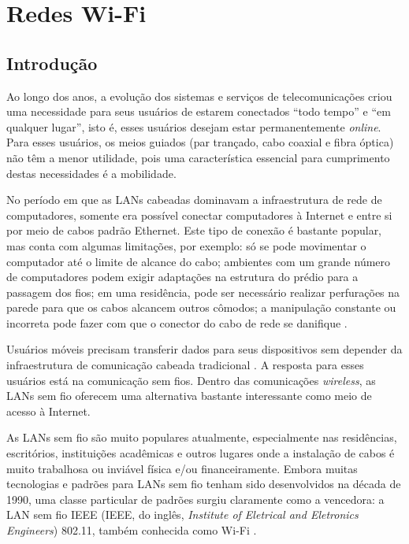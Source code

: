 \chapter{Redes Wi-Fi}
\label{cap:redes-wifi}

\section{Introdução}
\label{sec:introducao}

Ao longo dos anos, a evolução  dos sistemas e serviços de telecomunicações criou uma necessidade para seus usuários de estarem conectados ``todo tempo'' e ``em qualquer lugar'', isto é, esses usuários desejam estar permanentemente \textit{online}. Para esses usuários, os meios guiados (par trançado, cabo coaxial e fibra óptica) não têm a menor utilidade, pois uma característica essencial para cumprimento destas necessidades é a mobilidade.

No período em que as LANs cabeadas dominavam a infraestrutura de rede de computadores, somente era possível conectar computadores à Internet e entre si por meio de cabos padrão Ethernet. Este tipo de conexão é bastante popular, mas conta com algumas limitações, por exemplo: só se pode movimentar o computador até o limite de alcance do cabo; ambientes com um grande número de computadores podem exigir adaptações na estrutura do prédio para a passagem dos fios; em uma residência, pode ser necessário realizar perfurações na parede para que os cabos alcancem outros cômodos; a manipulação constante ou incorreta pode fazer com que o conector do cabo de rede se danifique \cite{alecrim2008site}.

Usuários móveis precisam transferir dados para seus dispositivos sem depender da infraestrutura de comunicação cabeada tradicional \cite{tanenbaum2011}. A resposta para esses usuários está na comunicação sem fios. Dentro das comunicações \textit{wireless}, as LANs sem fio oferecem uma alternativa bastante interessante como meio de acesso à Internet.

As LANs sem fio são muito populares atualmente, especialmente nas residências, escritórios, instituições acadêmicas e outros lugares onde a instalação de cabos é muito trabalhosa ou inviável física e/ou financeiramente. Embora muitas tecnologias e padrões para LANs sem fio tenham sido desenvolvidos na década de 1990, uma classe particular de padrões surgiu claramente como a vencedora: a LAN sem fio IEEE (IEEE, do inglês, \textit{Institute of Eletrical and Eletronics Engineers}) 802.11, também conhecida como Wi-Fi \cite{kurose2013}.

